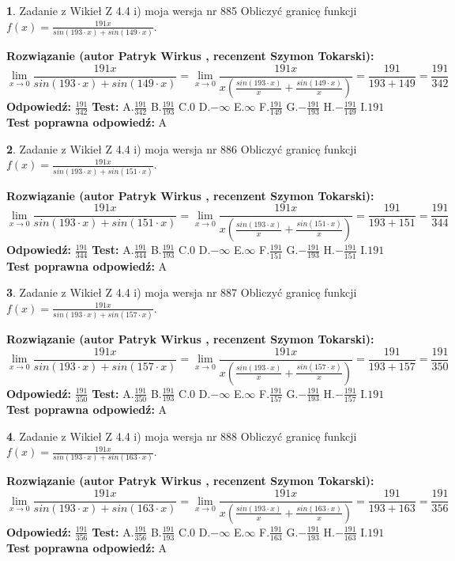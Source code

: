 \documentclass[12pt, a4paper]{article}
\theoremstyle{definition} %
\newtheorem{zad}{}
\newcommand{\zadStart}[1]{\begin{zad}#1\newline}
\newcommand{\zadStop}{\end{zad}}
\newcommand{\rozwStart}[2]{\noindent \textbf{Rozwiązanie (autor #1 , recenzent #2): }\newline}
\newcommand{\rozwStop}{\newline}
\newcommand{\odpStart}{\noindent \textbf{Odpowiedź:}\newline}
\newcommand{\odpStop}{\newline}
\newcommand{\testStart}{\noindent \textbf{Test:}\newline}
\newcommand{\testStop}{\newline}
\newcommand{\kluczStart}{\noindent \textbf{Test poprawna odpowiedź:}\newline}
\newcommand{\kluczStop}{\newline}
\begin{document}
\zadStart{Zadanie z Wikieł Z 4.4 i) moja wersja nr 885}
Obliczyć granicę funkcji $f(x)=\frac{191x}{sin(193\cdot x) +sin(149\cdot x)}$.
\zadStop
\rozwStart{Patryk Wirkus}{Szymon Tokarski}
$$\lim\limits_{x\to 0}\frac{191x}{sin(193\cdot x) +sin(149\cdot x)}=\lim\limits_{x\to 0}\frac{191x}{x(\frac{sin(193\cdot x)}{x}+\frac{sin(149\cdot x)}{x})}=\frac{191}{193+149} = \frac{191}{342}$$
\rozwStop
\odpStart
$\frac{191}{342}$
\odpStop
\testStart
A.$\frac{191}{342}$
B.$\frac{191}{193}$
C.$0$
D.$-\infty$
E.$\infty$
F.$\frac{191}{149}$
G.$-\frac{191}{193}$
H.$-\frac{191}{149}$
I.$191$
\testStop
\kluczStart
A
\kluczStop



\zadStart{Zadanie z Wikieł Z 4.4 i) moja wersja nr 886}
Obliczyć granicę funkcji $f(x)=\frac{191x}{sin(193\cdot x) +sin(151\cdot x)}$.
\zadStop
\rozwStart{Patryk Wirkus}{Szymon Tokarski}
$$\lim\limits_{x\to 0}\frac{191x}{sin(193\cdot x) +sin(151\cdot x)}=\lim\limits_{x\to 0}\frac{191x}{x(\frac{sin(193\cdot x)}{x}+\frac{sin(151\cdot x)}{x})}=\frac{191}{193+151} = \frac{191}{344}$$
\rozwStop
\odpStart
$\frac{191}{344}$
\odpStop
\testStart
A.$\frac{191}{344}$
B.$\frac{191}{193}$
C.$0$
D.$-\infty$
E.$\infty$
F.$\frac{191}{151}$
G.$-\frac{191}{193}$
H.$-\frac{191}{151}$
I.$191$
\testStop
\kluczStart
A
\kluczStop



\zadStart{Zadanie z Wikieł Z 4.4 i) moja wersja nr 887}
Obliczyć granicę funkcji $f(x)=\frac{191x}{sin(193\cdot x) +sin(157\cdot x)}$.
\zadStop
\rozwStart{Patryk Wirkus}{Szymon Tokarski}
$$\lim\limits_{x\to 0}\frac{191x}{sin(193\cdot x) +sin(157\cdot x)}=\lim\limits_{x\to 0}\frac{191x}{x(\frac{sin(193\cdot x)}{x}+\frac{sin(157\cdot x)}{x})}=\frac{191}{193+157} = \frac{191}{350}$$
\rozwStop
\odpStart
$\frac{191}{350}$
\odpStop
\testStart
A.$\frac{191}{350}$
B.$\frac{191}{193}$
C.$0$
D.$-\infty$
E.$\infty$
F.$\frac{191}{157}$
G.$-\frac{191}{193}$
H.$-\frac{191}{157}$
I.$191$
\testStop
\kluczStart
A
\kluczStop



\zadStart{Zadanie z Wikieł Z 4.4 i) moja wersja nr 888}
Obliczyć granicę funkcji $f(x)=\frac{191x}{sin(193\cdot x) +sin(163\cdot x)}$.
\zadStop
\rozwStart{Patryk Wirkus}{Szymon Tokarski}
$$\lim\limits_{x\to 0}\frac{191x}{sin(193\cdot x) +sin(163\cdot x)}=\lim\limits_{x\to 0}\frac{191x}{x(\frac{sin(193\cdot x)}{x}+\frac{sin(163\cdot x)}{x})}=\frac{191}{193+163} = \frac{191}{356}$$
\rozwStop
\odpStart
$\frac{191}{356}$
\odpStop
\testStart
A.$\frac{191}{356}$
B.$\frac{191}{193}$
C.$0$
D.$-\infty$
E.$\infty$
F.$\frac{191}{163}$
G.$-\frac{191}{193}$
H.$-\frac{191}{163}$
I.$191$
\testStop
\kluczStart
A
\kluczStop
\end{document}

